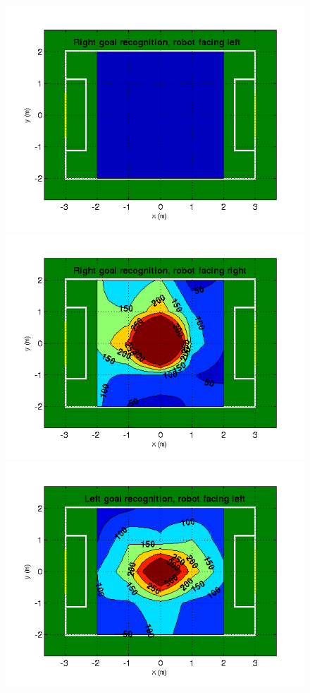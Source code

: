 \documentclass[runningheads,a4paper]{llncs}
\begin{document}
\begin{figure} [h]
\begin{minipage}[b]{0.5\textwidth}
\centering
\includegraphics[width=1\textwidth]{figures/RL}
\end{minipage}
\begin{minipage}[b]{0.5\textwidth}
\centering
\includegraphics[width=1\textwidth]{figures/RR}
\end{minipage}
\begin{minipage}[b]{0.5\textwidth}
\centering
\includegraphics[width=1\textwidth]{figures/LL}

\end{minipage}
\end{figure}
\end{document}
